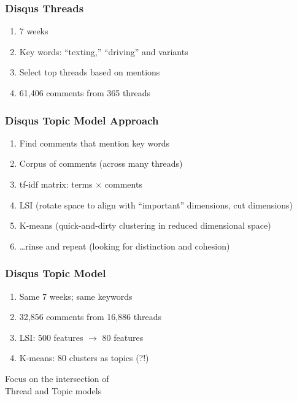 \documentclass{beamer}
\begin{document}
\begin{frame}\frametitle{Disqus Threads}
\begin{center}
{\Large 
\begin{enumerate}
\item 7 weeks
\item Key words: ``texting,'' ``driving'' and variants
\item Select top threads based on mentions
\item 61,406 comments from 365 threads
\end{enumerate}
}
\end{center}
\end{frame}

\begin{frame}\frametitle{Disqus Topic Model Approach}
\begin{center}
{\Large 
\begin{enumerate}
\item Find comments that mention key words
\item Corpus of comments (across many threads)
\item tf-idf matrix: terms $\times$ comments
\item LSI (rotate space to align with ``important'' dimensions, cut dimensions)
\item K-means (quick-and-dirty clustering in reduced dimensional space)
\item \ldots rinse and repeat (looking for distinction and cohesion)
\end{enumerate}
}
\end{center}
\end{frame}

\begin{frame}\frametitle{Disqus Topic Model}
\begin{center}
{\Large 
\begin{enumerate}
\item Same 7 weeks; same keywords
\item 32,856 comments from 16,886 threads
\item LSI: 500 features $\rightarrow$ 80 features
\item K-means: 80 clusters as topics (?!)
\end{enumerate}
}
\end{center}
\end{frame}

\begin{frame}
\begin{center}
{\Huge Focus on the intersection of \\[15 pt] Thread and Topic models}
\end{center}
\end{frame}
\end{document}
